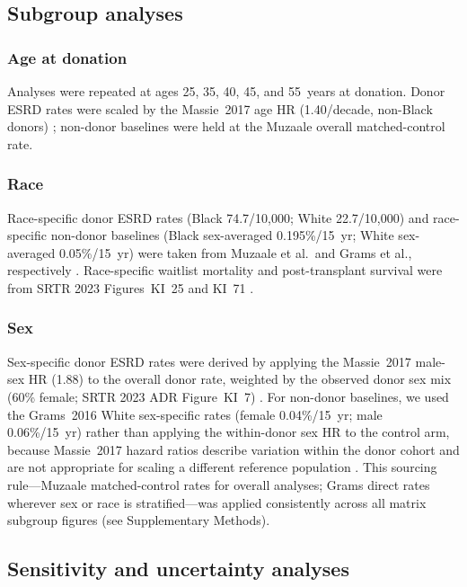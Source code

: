 \subsection{Subgroup analyses}

\subsubsection*{Age at donation}

Analyses were repeated at ages 25, 35, 40, 45, and 55~years at donation.
Donor ESRD rates were scaled by the Massie~2017 age HR (1.40/decade,
non-Black donors) \cite{massie_quantifying_2017}; non-donor baselines
were held at the Muzaale overall matched-control rate.

\subsubsection*{Race}

Race-specific donor ESRD rates (Black 74.7/10,000; White 22.7/10,000)
and race-specific non-donor baselines (Black sex-averaged 0.195\%/15~yr;
White sex-averaged 0.05\%/15~yr) were taken from Muzaale et al.\ and
Grams et al., respectively \cite{muzaale_risk_2014, grams_kidney-failure_2016}.
Race-specific waitlist mortality and post-transplant survival were from
SRTR 2023 Figures~KI~25 and KI~71 \cite{srtr_2023}.

\subsubsection*{Sex}

Sex-specific donor ESRD rates were derived by applying the Massie~2017
male-sex HR (1.88) to the overall donor rate, weighted by the observed
donor sex mix (60\% female; SRTR 2023 ADR Figure~KI~7) \cite{massie_quantifying_2017, srtr_2023}.
For non-donor baselines, we used the Grams~2016 White sex-specific
rates (female 0.04\%/15~yr; male 0.06\%/15~yr) rather than applying
the within-donor sex HR to the control arm, because Massie~2017
hazard ratios describe variation within the donor cohort and are not
appropriate for scaling a different reference population
\cite{grams_kidney-failure_2016}.
This sourcing rule---Muzaale matched-control rates for overall analyses;
Grams direct rates wherever sex or race is stratified---was applied
consistently across all matrix subgroup figures (see Supplementary Methods).

\subsection{Sensitivity and uncertainty analyses}

